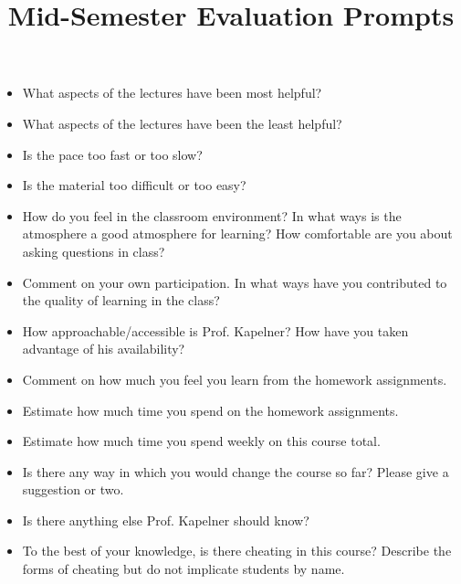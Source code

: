 \documentclass[12pt]{article}
\title{Mid-Semester Evaluation Prompts}
\begin{document}
\maketitle
\thispagestyle{empty}


\begin{itemize}
\item What aspects of the lectures have been most helpful?  
\item What aspects of the lectures have been the least helpful?
\item Is the pace too fast or too slow?  
\item Is the material too difficult or too easy?  
\item How do you feel in the classroom environment?  In what ways is the atmosphere a good atmosphere for learning?  How comfortable are you about asking questions in class?
\item Comment on your own participation.  In what ways have you contributed to the quality of learning in the class?
\item How approachable/accessible is Prof. Kapelner?  How have you taken advantage of his availability?
\item Comment on how much you feel you learn from the homework assignments.
\item Estimate how much time you spend on the homework assignments.
\item Estimate how much time you spend weekly on this course total.
\item Is there any way in which you would change the course so far?  Please give a suggestion or two. 
\item Is there anything else Prof. Kapelner should know?
\item To the best of your knowledge, is there cheating in this course? Describe the forms of cheating but do not implicate students by name.
\end{itemize}
\end{document}

